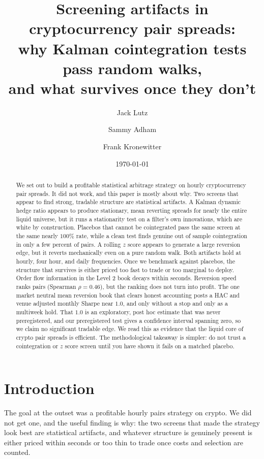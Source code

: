 \documentclass[11pt]{article}
\title{Screening artifacts in cryptocurrency pair spreads:\\
why Kalman cointegration tests pass random walks,\\
and what survives once they don't}
\author{Jack Lutz \and Sammy Adham \and Frank Kronewitter}
\date{\today}
\begin{document}
\maketitle

\begin{abstract}
We set out to build a profitable statistical arbitrage strategy on hourly cryptocurrency
pair spreads. It did not work, and this paper is mostly about why.
Two screens that appear to find strong, tradable structure are statistical artifacts. A
Kalman dynamic hedge ratio appears to produce stationary, mean reverting spreads for nearly
the entire liquid universe, but it runs a stationarity test on a filter's own innovations,
which are white by construction. Placebos that cannot be cointegrated pass the same screen at
the same nearly $100\%$ rate, while a clean test finds genuine out of sample cointegration in
only a few percent of pairs. A rolling $z$ score appears to generate a large reversion edge,
but it reverts mechanically even on a pure random walk. Both artifacts hold at hourly,
four hour, and daily frequencies. Once we benchmark against placebos, the structure that
survives is either priced too fast to trade or too marginal to deploy. Order flow information in
the Level 2 book decays within seconds. Reversion speed ranks pairs (Spearman $\rho = 0.46$), but
the ranking does not turn into profit. The one market neutral mean reversion book that clears
honest accounting posts a HAC and venue adjusted monthly Sharpe near $1.0$, and only without a
stop and only as a multiweek hold. That $1.0$ is an
exploratory, post hoc estimate that was never preregistered, and our preregistered test gives a
confidence interval spanning zero, so we claim no significant tradable edge. We read this as evidence that the
liquid core of crypto pair spreads is efficient. The methodological takeaway is simpler: do not
trust a cointegration or $z$ score screen until you have shown it fails on a matched placebo.
\end{abstract}

\section{Introduction}
\label{sec:intro}

The goal at the outset was a profitable hourly pairs strategy on crypto. We did not get one, and
the useful finding is why: the two screens that made the strategy look best are statistical
artifacts, and whatever structure is genuinely present is either priced within seconds or too thin
to trade once costs and selection are counted.
\end{document}
